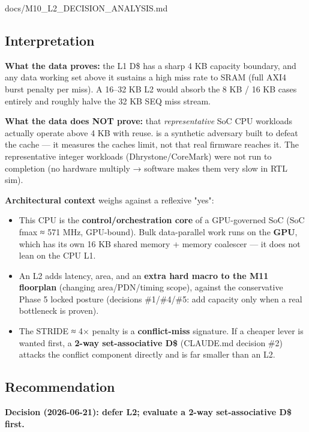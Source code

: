 \begin{relocated}{docs/M10_L2_DECISION_ANALYSIS.md}
\subsection{Interpretation}\label{tm:dec:m10-l2:3-interpretation}

\textbf{What the data proves:} the L1 D\$ has a sharp 4 KB capacity
boundary, and any data working set above it sustains a high miss rate to
SRAM (full AXI4 burst penalty per miss). A 16--32 KB L2 would absorb the
8 KB / 16 KB cases entirely and roughly halve the 32 KB SEQ miss stream.

\textbf{What the data does NOT prove:} that \emph{representative} SoC
CPU workloads actually operate above 4 KB with reuse.  is a
synthetic adversary built to defeat the cache --- it measures the
cache\textquotesingle s limit, not that real firmware reaches it. The
representative integer workloads (Dhrystone/\allowbreak{}CoreMark) were
not run to completion (no hardware multiply → software 
makes them very slow in RTL sim).

\textbf{Architectural context} weighs against a reflexive "yes":

\begin{itemize}
\tightlist
\item
  This CPU is the \textbf{control/\allowbreak{}orchestration core} of a
  GPU-governed SoC (SoC fmax ≈ 571 MHz, GPU-bound). Bulk data-parallel
  work runs on the \textbf{GPU}, which has its own 16 KB shared memory +
  memory coalescer --- it does not lean on the CPU L1.
\item
  An L2 adds latency, area, and an \textbf{extra hard macro to the M11
  floorplan} (changing area/\allowbreak{}PDN/\allowbreak{}timing scope),
  against the conservative Phase 5 locked posture (decisions
  \#1/\#4/\#5: add capacity only when a real bottleneck is proven).
\item
  The STRIDE ≈ 4× penalty is a \textbf{conflict-miss} signature. If a
  cheaper lever is wanted first, a \textbf{2-way set-associative D\$}
  (CLAUDE.md decision \#2) attacks the conflict component directly and
  is far smaller than an L2.
\end{itemize}

\subsection{Recommendation}\label{tm:dec:m10-l2:4-recommendation}

\textbf{Decision (2026-06-21): defer L2; evaluate a 2-way
set-associative D\$ first.}


\end{relocated}
